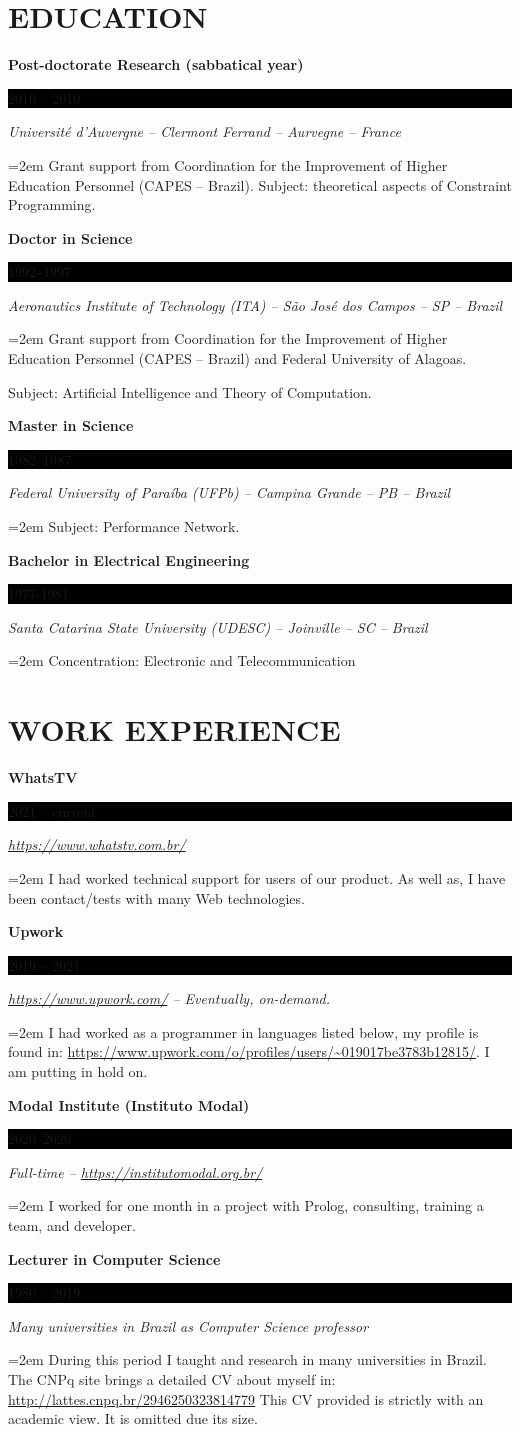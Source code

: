 \documentclass[paper=a4,fontsize=11pt]{scrartcl} %
\newcommand{\sepspace}{\vspace*{0.8em}}		%
\newcommand{\NewPart}[1]{\section*{\uppercase{#1}}}
\newcommand{\EducationEntry}[4]{
		\noindent \textbf{#1} \hfill      %
		\colorbox{Black}{%
			\parbox{6em}{%
			\hfill\color{White}#2}} \par  %
		\noindent \textit{#3} \par        %
		\noindent\hangindent=2em\hangafter=0 \small #4 %
		\normalsize \par}
\begin{document}
\NewPart{Education}{}


\EducationEntry{Post-doctorate Research (sabbatical year)}{2010 -- 2010}{Université d'Auvergne -- Clermont Ferrand -- Aurvegne -- France}{Grant support from  Coordination for the Improvement of Higher Education Personnel (CAPES -- Brazil). Subject: theoretical aspects of Constraint Programming.}
\sepspace

\EducationEntry{Doctor in Science}{1992--1997}{Aeronautics Institute of Technology (ITA) -- São José dos Campos -- SP -- Brazil}{Grant support from  Coordination for the Improvement of Higher Education Personnel (CAPES -- Brazil) and Federal University of Alagoas.} {Subject: Artificial Intelligence and Theory of Computation.}
\sepspace

\EducationEntry{Master in Science}{1982--1987}{Federal University of Paraíba (UFPb) -- Campina Grande -- PB -- Brazil}{Subject: Performance Network.}
\sepspace

\EducationEntry{Bachelor in Electrical Engineering}{1977-1981}{Santa Catarina State University (UDESC) -- Joinville -- SC -- Brazil}{Concentration: Electronic and Telecommunication}
\NewPart{Work experience}%

\EducationEntry{WhatsTV}{2021 -- current}{\url{https://www.whatstv.com.br/}}{I had worked technical support for users of our product. As well as, I have been contact/tests with many Web technologies.}
\sepspace

\EducationEntry{Upwork}{2019 -- 2021}{\url{https://www.upwork.com/} -- Eventually,  on-demand.}{I had worked as a programmer in languages listed below, my profile is found in: \url{https://www.upwork.com/o/profiles/users/~019017be3783b12815/}. I am putting in hold on.}
\sepspace

\EducationEntry{Modal Institute (Instituto Modal)}{2020--2020}{Full-time -- \url{https://institutomodal.org.br/}}
{I worked for one month in a project with Prolog, consulting, training a team, and developer.}
\sepspace

\EducationEntry{Lecturer in Computer Science} {1986 -- 2019}{Many universities in Brazil as Computer Science professor}{During this period I taught and research in many universities in Brazil. The CNPq site brings a detailed CV about myself in: \underline{\url{http://lattes.cnpq.br/2946250323814779}}  This CV provided is strictly with an academic view. It is omitted due its size.}
\end{document}
